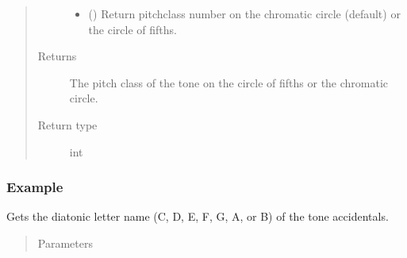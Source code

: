 \documentclass[letterpaper,10pt,english]{sphinxmanual}
\begin{document}
\begin{fulllineitems}
\begin{fulllineitems}
\begin{quote}
\begin{description}
\begin{itemize}
\item {} 
 () \textendash{} Return pitch\sphinxhyphen{}class number on the chromatic circle (default) or the circle of fifths.

\end{itemize}

\item[{Returns}] \leavevmode
The pitch class of the tone on the circle of fifths or the chromatic circle.

\item[{Return type}] \leavevmode
int

\end{description}\end{quote}
\subsubsection*{Example}

\begin{sphinxVerbatim}[commandchars=\\\{\}]
   
\end{sphinxVerbatim}

\begin{sphinxVerbatim}[commandchars=\\\{\}]
   
\end{sphinxVerbatim}

\end{fulllineitems}


\begin{fulllineitems}
\label{\detokenize{api:musictheory.Tone.get_step}}
Gets the diatonic letter name (C, D, E, F, G, A, or B) of the tone  accidentals.
\begin{quote}\begin{description}
\item[{Parameters}] \leavevmode
{} \textendash{} 


\end{description}
\end{quote}
\end{fulllineitems}
\end{fulllineitems}
\end{document}
